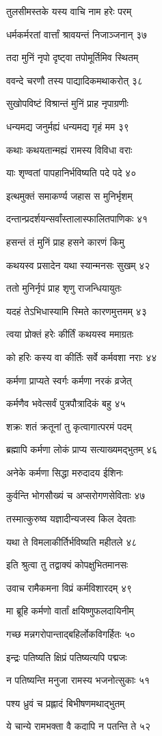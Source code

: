 तुलसीमस्तके यस्य वाचि नाम हरेः परम्

धर्मकर्मरतां वार्त्तां श्रावयन्तं निजाञ्जनान् ३७

तदा मुनिं नृपो दृष्ट्वा तपोमूर्तिमिव स्थितम्

ववन्दे चरणौ तस्य पाद्यादिकमथाकरोत् ३८

सुखोपविष्टं विश्रान्तं मुनिं प्राह नृपाग्रणीः

धन्यमद्य जनुर्मह्यं धन्यमद्य गृहं मम ३९

कथाः कथयतान्मह्यं रामस्य विविधा वराः

याः शृण्वतां पापहानिर्भविष्यति पदे पदे ४०

इत्थमुक्तं समाकर्ण्य जहास स मुनिर्भृशम्

दन्तान्प्रदर्शयन्सर्वांस्तालास्फालितपाणिकः ४१

हसन्तं तं मुनिं प्राह हसने कारणं किमु

कथयस्व प्रसादेन यथा स्यान्मनसः सुखम् ४२

ततो मुनिर्नृपं प्राह शृणु राजन्धियायुतः

यदहं तेऽभिधास्यामि स्मिते कारणमुत्तमम् ४३

त्वया प्रोक्तं हरेः कीर्तिं कथयस्व ममाग्रतः

को हरिः कस्य वा कीर्तिः सर्वे कर्मवशा नराः ४४

कर्मणा प्राप्यते स्वर्गः कर्मणा नरकं व्रजेत्

कर्मणैव भवेत्सर्वं पुत्रपौत्रादिकं बहु ४५

शक्रः शतं क्रतूनां तु कृत्वागात्परमं पदम्

ब्रह्मापि कर्मणा लोकं प्राप्य सत्याख्यमद्भुतम् ४६

अनेके कर्मणा सिद्धा मरुदादय ईशिनः

कुर्वन्ति भोगसौख्यं च अप्सरोगणसेविताः ४७

तस्मात्कुरुष्व यज्ञादीन्यजस्व किल देवताः

यथा ते विमलाकीर्तिर्भविष्यति महीतले ४८

इति श्रुत्वा तु तद्वाक्यं कोपक्षुभितमानसः

उवाच रामैकमना विप्रं कर्मविशारदम् ४९

मा ब्रूहि कर्मणो वार्तां क्षयिष्णुफलदायिनीम्

गच्छ मन्नगरोपान्ताद्बहिर्लोकविगर्हितः ५०

इन्द्रः पतिष्यति क्षिप्रं पतिष्यत्यपि पद्मजः

न पतिष्यन्ति मनुजा रामस्य भजनोत्सुकाः ५१

पश्य ध्रुवं च प्रह्लादं बिभीषणमथाद्भुतम्

ये चान्ये रामभक्ता वै कदापि न पतन्ति ते ५२

